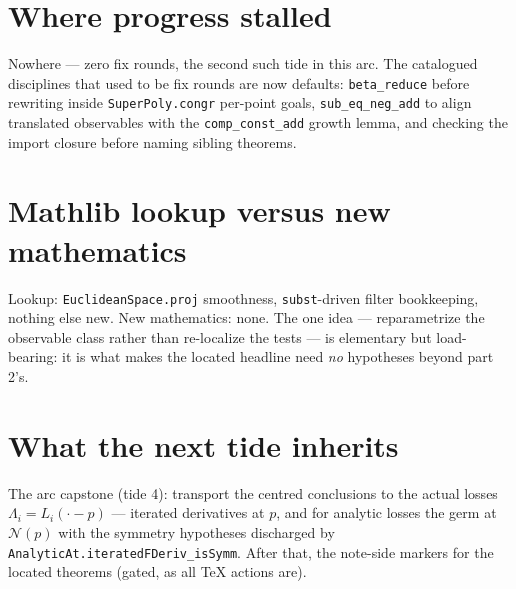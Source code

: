 \documentclass[11pt]{article}
\newcommand{\code}[1]{\texttt{#1}}
\begin{document}
\section{Where progress stalled}

Nowhere --- zero fix rounds, the second such tide in this arc. The
catalogued disciplines that used to be fix rounds are now defaults:
\code{beta\_reduce} before rewriting inside \code{SuperPoly.congr}
per-point goals, \code{sub\_eq\_neg\_add} to align translated
observables with the \code{comp\_const\_add} growth lemma, and
checking the import closure before naming sibling theorems.

\section{Mathlib lookup versus new mathematics}

Lookup: \code{EuclideanSpace.proj} smoothness, \code{subst}-driven
filter bookkeeping, nothing else new. New mathematics: none. The one
idea --- reparametrize the observable class rather than re-localize
the tests --- is elementary but load-bearing: it is what makes the
located headline need \emph{no} hypotheses beyond part 2's.

\section{What the next tide inherits}

The arc capstone (tide 4): transport the centred conclusions to the
actual losses $\Lambda_i = L_i(\cdot - p)$ --- iterated derivatives
at $p$, and for analytic losses the germ at $\mathcal{N}(p)$ with the
symmetry hypotheses discharged by
\code{AnalyticAt.iteratedFDeriv\_isSymm}. After that, the note-side
markers for the located theorems (gated, as all TeX actions are).
\end{document}
